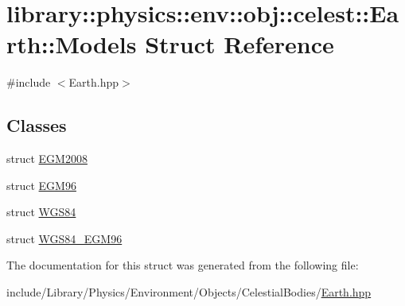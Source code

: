 \hypertarget{structlibrary_1_1physics_1_1env_1_1obj_1_1celest_1_1_earth_1_1_models}{}\section{library\+:\+:physics\+:\+:env\+:\+:obj\+:\+:celest\+:\+:Earth\+:\+:Models Struct Reference}
\label{structlibrary_1_1physics_1_1env_1_1obj_1_1celest_1_1_earth_1_1_models}


{\ttfamily \#include $<$Earth.\+hpp$>$}

\subsection*{Classes}
\begin{DoxyCompactItemize}
\item 
struct \hyperlink{structlibrary_1_1physics_1_1env_1_1obj_1_1celest_1_1_earth_1_1_models_1_1_e_g_m2008}{E\+G\+M2008}
\item 
struct \hyperlink{structlibrary_1_1physics_1_1env_1_1obj_1_1celest_1_1_earth_1_1_models_1_1_e_g_m96}{E\+G\+M96}
\item 
struct \hyperlink{structlibrary_1_1physics_1_1env_1_1obj_1_1celest_1_1_earth_1_1_models_1_1_w_g_s84}{W\+G\+S84}
\item 
struct \hyperlink{structlibrary_1_1physics_1_1env_1_1obj_1_1celest_1_1_earth_1_1_models_1_1_w_g_s84___e_g_m96}{W\+G\+S84\+\_\+\+E\+G\+M96}
\end{DoxyCompactItemize}


The documentation for this struct was generated from the following file\+:\begin{DoxyCompactItemize}
\item 
include/\+Library/\+Physics/\+Environment/\+Objects/\+Celestial\+Bodies/\hyperlink{_earth_8hpp}{Earth.\+hpp}\end{DoxyCompactItemize}
